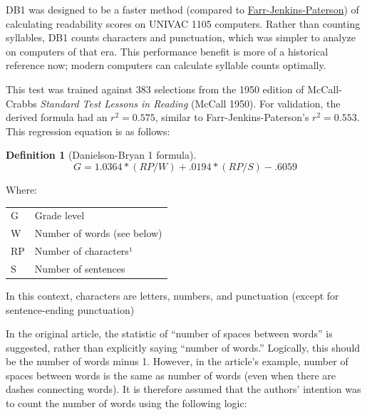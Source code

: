 \documentclass[
]{book}
\theoremstyle{definition}
\newtheorem{definition}{Definition}[chapter]
\theoremstyle{definition}
\theoremstyle{definition}
\theoremstyle{definition}
\theoremstyle{remark}
\begin{document}
DB1 was designed to be a faster method (compared to \protect\hyperlink{farr-jenkins-paterson}{Farr-Jenkins-Paterson}) of calculating readability scores on UNIVAC 1105 computers. Rather than counting syllables, DB1 counts characters and punctuation, which was simpler to analyze on computers of that era. This performance benefit is more of a historical reference now; modern computers can calculate syllable counts optimally.

This test was trained against 383 selections from the 1950 edition of McCall-Crabbs \emph{Standard Test Lessons in Reading} (McCall 1950). For validation, the derived formula had an \(r^2 = 0.575\), similar to Farr-Jenkins-Paterson's \(r^2 = 0.553\). This regression equation is as follows:

\begin{definition}[Danielson-Bryan 1 formula]
\protect\hypertarget{def:db1}{}{\label{def:db1} {} }\[
G = 1.0364*(RP/W) + .0194*(RP/S) - .6059
\]
\end{definition}

Where:

\begin{table}
\centering
\begin{threeparttable}
\begin{tabular}[t]{l>{\raggedright\arraybackslash}p{10cm}}
\toprule
G & Grade level\\
W & Number of words (see below)\\
RP & Number of characters¹\\
S & Number of sentences\\
\bottomrule
\end{tabular}
\begin{tablenotes}
\item[1] In this context, characters are letters, numbers, and punctuation (except for sentence-ending punctuation)
\end{tablenotes}
\end{threeparttable}
\end{table}

In the original article, the statistic of ``number of spaces between words'' is suggested, rather than explicitly saying ``number of words.'' Logically, this should be the number of words minus 1. However, in the article's example, number of spaces between words is the same as number of words (even when there are dashes connecting words). It is therefore assumed that the authors' intention was to count the number of words using the following logic:
\end{document}
